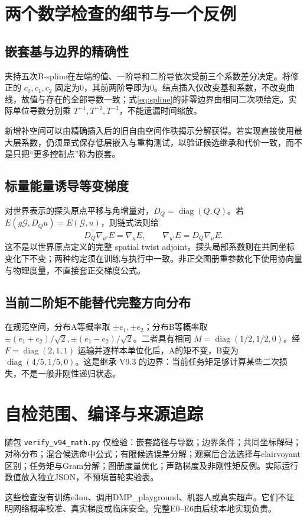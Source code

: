\documentclass[UTF8,fontset=fandol,11pt,a4paper]{ctexart}
\theoremstyle{plain}
\theoremstyle{definition}
\theoremstyle{remark}
\numberwithin{equation}{section}
\DeclareMathOperator{\diag}{diag}
\newcommand{\code}[1]{\begingroup\small\nolinkurl{#1}\endgroup}
\begin{document}
\appendix
\section{两个数学检查的细节与一个反例}
\label{app:math}
\subsection{嵌套基与边界的精确性}
夹持五次B-spline在左端的值、一阶导和二阶导依次受前三个系数差分决定。将修正的 $c_0,c_1,c_2$ 固定为0，其前两阶导即为0。结点插入仅改变基和系数，不改变曲线，故值与存在的全部导数一致；式\eqref{eq:spline}的非零边界由相同二次项给定。实际单位导数分别乘 $T^{-1},T^{-2},T^{-3}$，不能遗漏时间缩放。

新增补空间可以由精确插入后的旧自由空间作秩揭示分解获得。若实现直接使用最大层系数，仍须显式保存低层嵌入与重构测试，以验证候选继承和代价一致，而不是只把“更多控制点”称为嵌套。

\subsection{标量能量诱导等变梯度}
对世界表示的探头原点平移与角增量对，$D_Q=\diag(Q,Q)$。若 $E(g\mathcal G,D_Qu)=E(\mathcal G,u)$，则链式法则给
\[
D_Q^\top\nabla_{u'}E=\nabla_uE,\qquad
\nabla_{u'}E=D_Q\nabla_uE.
\]
这不是以世界原点定义的完整 spatial twist adjoint。探头局部系数则在共同坐标变化下不变；两种约定须在训练与执行中一致。非正交图册重参数化下使用协向量与物理度量，不直接套正交梯度公式。

\subsection{当前二阶矩不能替代完整方向分布}
在规范空间，分布A等概率取 $\pm e_1,\pm e_2$；分布B等概率取 $\pm(e_1+e_2)/\sqrt2,\pm(e_1-e_2)/\sqrt2$。二者具有相同 $M=\diag(1/2,1/2,0)$。经 $F=\diag(2,1,1)$ 运输并逐样本单位化后，A的矩不变，B变为 $\diag(4/5,1/5,0)$。这是继承 V9.3 的边界：当前任务矩足够计算某些二次损失，不是一般非刚性递归状态。

\section{自检范围、编译与来源追踪}
随包 \code{verify_v94_math.py} 仅检验：嵌套路径与导数；边界条件；共同坐标解码；对称分布；混合候选命中公式；有限候选误差分解；观察后合法选择与clairvoyant区别；任务矩与Gram分解；图册度量优化；声路梯度及非刚性矩反例。实际运行数值放入独立JSON，不预填首轮实验表。

这些检查没有训练e3nn、调用DMP\_playground、机器人或真实超声。它们不证明网络概率校准、真实梯度或临床安全。完整E0--E6由后续本地实现负责。
\end{document}
